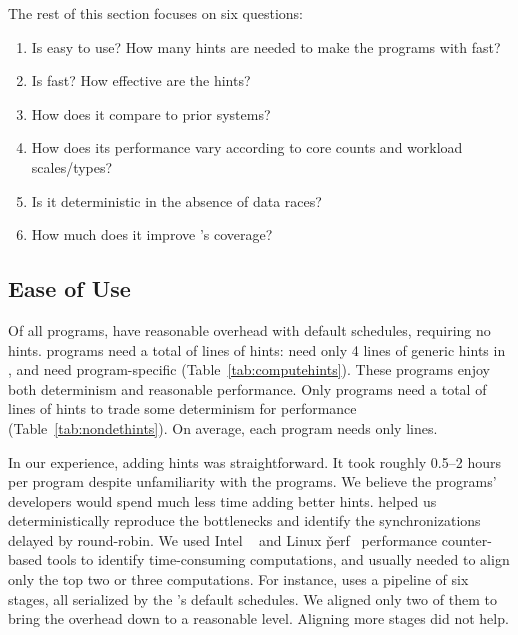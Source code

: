 The rest of this section focuses on six questions:
\begin{enumerate}

\item[\S\ref{sec:ease-of-use}:] Is \parrot easy to use?  How many hints are
  needed to make the programs with \parrot fast?

\item[\S\ref{sec:performance}:] Is \parrot fast?  How effective are the
  hints?

\item[\S\ref{sec:comparison}:] How does it compare to prior systems?

\item[\S\ref{sec:sensitivity}:] How does its performance vary according
  to core counts and workload scales/types?

\item[\S\ref{sec:determinism}:] Is it deterministic in the absence of data races?

\item[\S\ref{sec:coverage}:] How much does it improve \dbug's coverage?

\end{enumerate}

\subsection{Ease of Use} \label{sec:ease-of-use}

Of all \nprog programs, \nprognohints have reasonable overhead with
default schedules, requiring no hints.  \nproglineuphints programs need a total of 
\nlineofcomputehints lines of \compute hints: \nproggenericlineuphints
need only 4 lines of generic \compute hints in \libgomp, and
\nprogspecificlineuphints need program-specific \computes
(Table~\ref{tab:computehints}).  These programs enjoy both determinism and
reasonable performance.  Only \nprognondethints programs 
need a total of \nlineofnondethints lines of \nondet hints to
trade some determinism for performance (Table~\ref{tab:nondethints}).
On average, each program needs only \hintsperprog lines.

In our experience, adding hints was straightforward.  It took roughly 0.5--2 hours per
program despite unfamiliarity with the programs.  We believe
the programs' developers would spend much less time adding better hints.
\parrot helped us deterministically reproduce the bottlenecks and identify
the synchronizations delayed by round-robin.  We used Intel \vtune~\cite{vtune} and
Linux \v{perf}~\cite{perf} performance counter-based tools to identify time-consuming
computations, and usually needed to align only the top two or three
computations.  For instance, \ferret uses a pipeline of six stages, all
serialized by the \parrot's default schedules.  We aligned only two of them to bring
the overhead down to a reasonable level.  Aligning more stages did not help.

